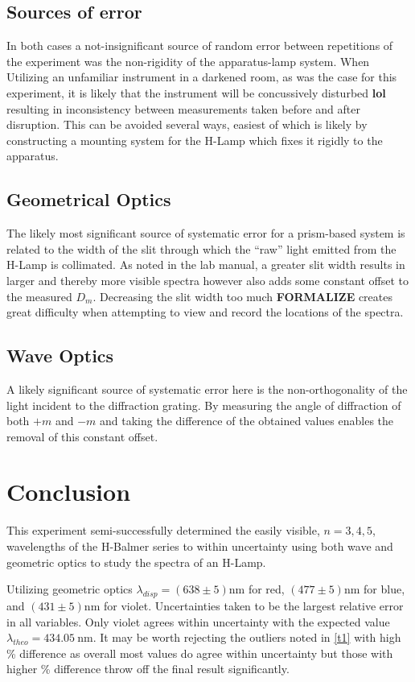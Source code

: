 \documentclass[10pt, twocolumn]{article}
\theoremstyle{definition}
\begin{document}
\subsection{Sources of error}
In both cases a not-insignificant source of random error between repetitions of the experiment was the non-rigidity of the apparatus-lamp system. When Utilizing
an unfamiliar instrument in a darkened room, as was the case for this experiment, it is likely that the instrument will be concussively disturbed \textbf{lol} resulting
in inconsistency between measurements taken before and after disruption. This can be avoided several ways, easiest of which is likely by constructing a mounting
system for the H-Lamp which fixes it rigidly to the apparatus.
\subsection{Geometrical Optics}
The likely most significant source of systematic error for a prism-based system is related to the width of the slit through which the ``raw'' light emitted from
the H-Lamp is collimated. As noted in the lab manual, a greater slit width results in larger and thereby more visible spectra however also adds some constant offset to the measured $D_m$.
Decreasing the slit width too much \textbf{FORMALIZE} creates great difficulty when attempting to view and record the locations of the spectra.
\subsection{Wave Optics} \label{wave-err}
A likely significant source of systematic error here is the non-orthogonality of the light incident to the diffraction grating. By measuring the angle of diffraction
of both $+m$ and $-m$ and taking the difference of the obtained values enables the removal of this constant offset.
\section{Conclusion}
This experiment semi-successfully determined the easily visible, $n=3,4,5$, wavelengths of the H-Balmer series to within uncertainty using both wave and geometric optics to study the spectra of an H-Lamp.

Utilizing geometric optics $\lambda_{disp}=(638 \pm 5)\unit{\nano\meter}$ for red, $(477\pm5)\unit{\nano\meter}$ for blue, and $(431\pm5)\unit{\nano\meter}$ for violet. Uncertainties taken
to be the largest relative error in all variables. Only violet agrees within uncertainty with the expected value $\lambda_{theo}=\qty{434.05}{\nano\meter}$. It may be worth rejecting the outliers
noted in \ref{t1} with high \% difference as overall most values do agree within uncertainty but those with higher \% difference throw off the final result significantly.
\end{document}
